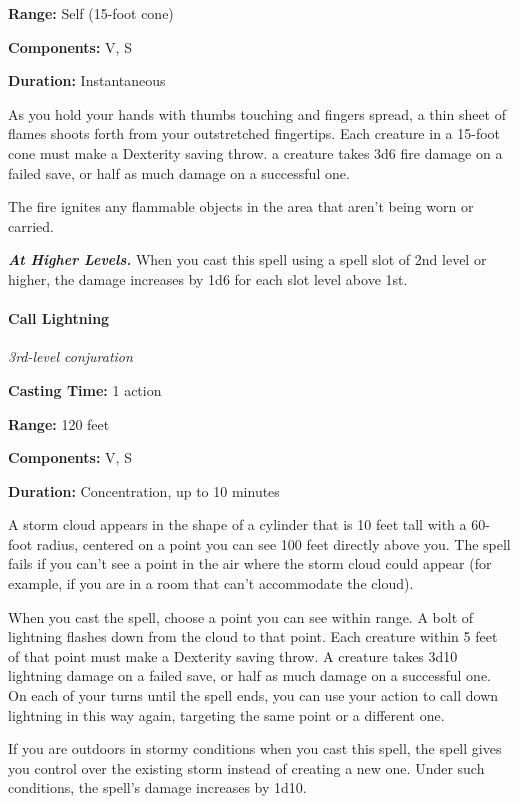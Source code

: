 \documentclass[
]{article}
\begin{document}
\textbf{Range:} Self (15-foot cone)

\textbf{Components:} V, S

\textbf{Duration:} Instantaneous

As you hold your hands with thumbs touching and fingers spread, a thin
sheet of flames shoots forth from your outstretched fingertips. Each
creature in a 15-foot cone must make a Dexterity saving throw. a
creature takes 3d6 fire damage on a failed save, or half as much damage
on a successful one.

The fire ignites any flammable objects in the area that aren't being
worn or carried.

\emph{\textbf{At Higher Levels.}} When you cast this spell using a spell
slot of 2nd level or higher, the damage increases by 1d6 for each slot
level above 1st.

\hypertarget{call-lightning}{%
\paragraph{Call Lightning}\label{call-lightning}}

\emph{3rd-level conjuration}

\textbf{Casting Time:} 1 action

\textbf{Range:} 120 feet

\textbf{Components:} V, S

\textbf{Duration:} Concentration, up to 10 minutes

A storm cloud appears in the shape of a cylinder that is 10 feet tall
with a 60-foot radius, centered on a point you can see 100 feet directly
above you. The spell fails if you can't see a point in the air where the
storm cloud could appear (for example, if you are in a room that can't
accommodate the cloud).

When you cast the spell, choose a point you can see within range. A bolt
of lightning flashes down from the cloud to that point. Each creature
within 5 feet of that point must make a Dexterity saving throw. A
creature takes 3d10 lightning damage on a failed save, or half as much
damage on a successful one. On each of your turns until the spell ends,
you can use your action to call down lightning in this way again,
targeting the same point or a different one.

If you are outdoors in stormy conditions when you cast this spell, the
spell gives you control over the existing storm instead of creating a
new one. Under such conditions, the spell's damage increases by 1d10.
\end{document}
